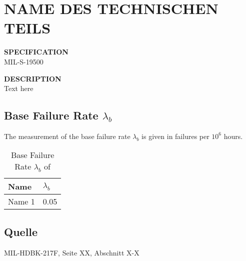 \section{NAME DES TECHNISCHEN TEILS}

\begin{minipage}[t]{0.29\textwidth}
    \textbf{SPECIFICATION}\\
    MIL-S-19500
\end{minipage}
\begin{minipage}[t]{0.7\textwidth}
    \textbf{DESCRIPTION}\\
    Text here
\end{minipage}

\subsection{Base Failure Rate $\lambda_b$}
The measurement of the base failure rate $\lambda_b$ is given in failures per $10^6$ hours.
\begin{table}[ht]
{\centering

\begin{tabular}{|p{7.5cm}|p{5cm}|}
    \hline
    \textbf{Name} & \textbf{$\lambda_b$} \\
    \hline
    Name 1 & 0.05 \\
    \hline
\end{tabular}

\caption{Base Failure Rate $\lambda_b$ of }

\label{tab:beispiel}
\par}
\end{table}
\subsection*{Quelle}
MIL-HDBK-217F, Seite XX, Abschnitt X-X